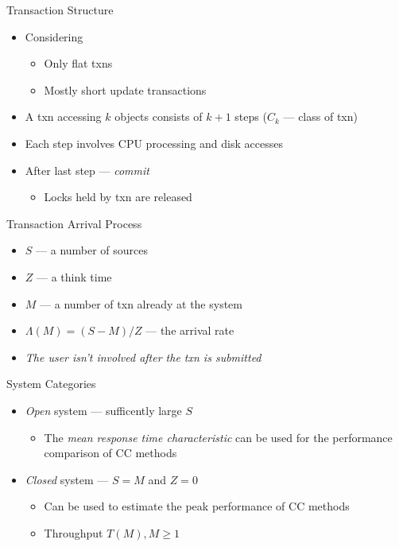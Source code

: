 \documentclass[sans]{beamer}
\begin{document}
\begin{frame}{Transaction Structure}
  \begin{itemize}
    \item Considering
      \begin{itemize}
        \item Only flat txns
        \item Mostly short update transactions
      \end{itemize}

    \vfill

    \item A txn accessing $k$ objects consists of
      $k + 1$ steps ($C_k$ --- class of txn)
    \item Each step involves CPU processing and disk accesses
    \item After last step --- \emph{commit}
    \begin{itemize}
      \item Locks held by txn are released
    \end{itemize}

  \end{itemize}
\end{frame}

\begin{frame}{Transaction Arrival Process}
  \begin{itemize}
    \item $S$ --- a number of sources
    \item $Z$ --- a think time
    \item $M$ --- a number of txn already at the system
    \vfill
    \item $\Lambda(M) = (S - M)/Z$ --- the arrival rate

    \vfill
    \item \emph{The user isn't involved after the txn is submitted}
  \end{itemize}
\end{frame}

\begin{frame}{System Categories}
  \begin{itemize}
    \item \emph{Open} system --- sufficently large $S$
    \begin{itemize}
      \item The \emph{mean response time characteristic} can be used for the
            performance comparison of CC methods
    \end{itemize}
    \item \emph{Closed} system --- $S = M$ and $Z = 0$
    \begin{itemize}
      \item Can be used to estimate the peak performance of CC methods
      \item Throughput $T(M), M \geq 1$ 
    \end{itemize}
  \end{itemize}
\end{frame}
\end{document}
